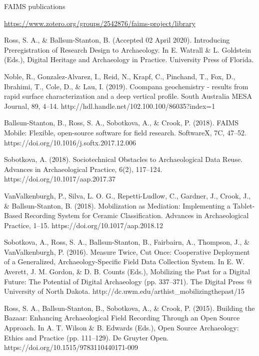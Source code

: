\documentclass[aspectratio=169, 12pt]{beamer} %
\begin{document}
\begin{frame}[allowframebreaks]{FAIMS publications}
\small{ \url{https://www.zotero.org/groups/2542876/faims-project/library}

        \nocite{Ross2020-yg,Noble2019-qg,Ballsun-Stanton2018-zd,Sobotkova2018-al,VanValkenburgh2018-hv,Sobotkova2016-mx,Ross2015-ph,Sobotkova2015-lq,Ross2013-hi}
        
        Ross, S. A., \& Ballsun-Stanton, B. (Accepted 02 April 2020). Introducing Preregistration of Research Design to Archaeology. In E. Watrall \& L. Goldstein (Eds.), Digital Heritage and Archaeology in Practice. University Press of Florida.
        
        Noble, R., Gonzalez-Alvarez, I., Reid, N., Krapf, C., Pinchand, T., Fox, D., Ibrahimi, T., Cole, D., \& Lau, I. (2019). Coompana geochemistry - results from rapid surface characterization and a deep vertical profile. South Australia MESA Journal, 89, 4–14. http://hdl.handle.net/102.100.100/86035?index=1
        
        Ballsun-Stanton, B., Ross, S. A., Sobotkova, A., \& Crook, P. (2018). FAIMS Mobile: Flexible, open-source software for field research. SoftwareX, 7C, 47–52. https://doi.org/10.1016/j.softx.2017.12.006
        
        Sobotkova, A. (2018). Sociotechnical Obstacles to Archaeological Data Reuse. Advances in Archaeological Practice, 6(2), 117–124. https://doi.org/10.1017/aap.2017.37
        
        VanValkenburgh, P., Silva, L. O. G., Repetti-Ludlow, C., Gardner, J., Crook, J., \& Ballsun-Stanton, B. (2018). Mobilization as Mediation: Implementing a Tablet-Based Recording System for Ceramic Classification. Advances in Archaeological Practice, 1–15. https://doi.org/10.1017/aap.2018.12
        
        Sobotkova, A., Ross, S. A., Ballsun-Stanton, B., Fairbairn, A., Thompson, J., \& VanValkenburgh, P. (2016). Measure Twice, Cut Once: Cooperative Deployment of a Generalized, Archaeology-Specific Field Data Collection System. In E. W. Averett, J. M. Gordon, \& D. B. Counts (Eds.), Mobilizing the Past for a Digital Future: The Potential of Digital Archaeology (pp. 337–371). The Digital Press @ University of North Dakota. http://dc.uwm.edu/arthist\_mobilizingthepast/15 
        
        Ross, S. A., Ballsun-Stanton, B., Sobotkova, A., \& Crook, P. (2015). Building the Bazaar: Enhancing Archaeological Field Recording Through an Open Source Approach. In A. T. Wilson \& B. Edwards (Eds.), Open Source Archaeology: Ethics and Practice (pp. 111–129). De Gruyter Open. https://doi.org/10.1515/9783110440171-009
        
}
\end{frame}
\end{document}
